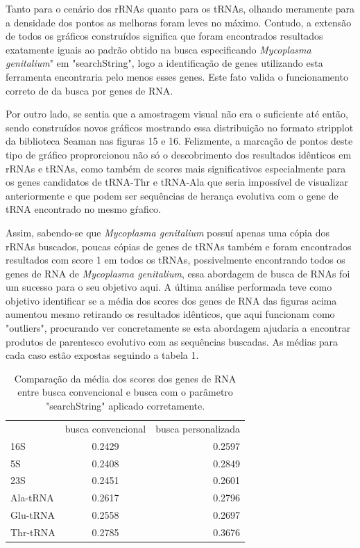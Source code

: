 \documentclass[brazilian,12pt,a4paper,final]{article}
\begin{document}
	Tanto para o cenário dos rRNAs quanto para os tRNAs, olhando meramente para a densidade dos pontos as melhoras foram leves no máximo. Contudo, a extensão de todos os gráficos construídos significa que foram encontrados resultados exatamente iguais ao padrão obtido na busca especificando \textit{Mycoplasma genitalium}" em "searchString", logo a identificação de genes utilizando esta ferramenta encontraria pelo menos esses genes. Este fato valida o funcionamento correto de da busca por genes de RNA.
	
	\vspace{0.5cm}
	
	Por outro lado, se sentia que a amostragem visual não era o suficiente até então, sendo construídos novos gráficos mostrando essa distribuição no formato stripplot da biblioteca Seaman nas figuras 15 e 16. Felizmente, a marcação de pontos deste tipo de gráfico proprorcionou não só o descobrimento dos resultados idênticos em rRNAs e tRNAs, como também de scores mais significativos especialmente para os genes candidatos de tRNA-Thr e tRNA-Ala que seria impossível de visualizar anteriormente e que podem ser sequências de herança evolutiva com o gene de tRNA encontrado no mesmo gŕafico.
	
	\vspace{0.5cm}
	
	Assim, sabendo-se que \textit{Mycoplasma genitalium} possuí apenas uma cópia dos rRNAs buscados, poucas cópias de genes de tRNAs também e foram encontrados resultados com score 1 em todos os tRNAs, possivelmente encontrando todos os genes de RNA de \textit{Mycoplasma genitalium}, essa abordagem de busca de RNAs foi um sucesso para o seu objetivo aqui. A última análise performada teve como objetivo identificar se a média dos scores dos genes de RNA das figuras acima aumentou mesmo retirando os resultados idênticos, que aqui funcionam como "outliers", procurando ver concretamente se esta abordagem ajudaria a encontrar produtos de parentesco evolutivo com as sequências buscadas. As médias para cada caso estão expostas seguindo a tabela 1.
	
	
	\begin{table}[b]
		\centering
		\begin{tabular}{lcr}
				& busca convencional & busca personalizada \\
			16S & 0.2429 & 0.2597 \\
			5S & 0.2408 & 0.2849 \\
			23S & 0.2451 & 0.2601 \\
			Ala-tRNA & 0.2617 & 0.2796 \\
			Glu-tRNA & 0.2558 & 0.2697 \\
			Thr-tRNA & 0.2785 & 0.3676 \\
		\end{tabular}
		\caption{Comparação da média dos scores dos genes de RNA entre busca convencional e busca com o parâmetro "searchString" aplicado corretamente.}
		\label{tab:1}
	\end{table}
\end{document}
